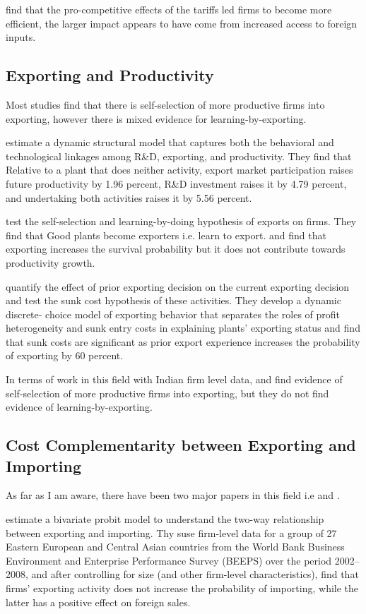 \documentclass[12pt]{article}
\begin{document}
\textcite{topalova2011trade} find that the pro-competitive
effects of the tariffs led firms to become more
efficient, the larger impact appears to have come from 
increased access to foreign inputs.
\subsection*{Exporting and Productivity}
Most studies find that there is self-selection of more productive
firms into exporting, however there is mixed evidence for
learning-by-exporting. 

\textcite{aw2011}  estimate a dynamic structural model that captures both the behavioral
and technological linkages among R\&D, exporting, and
productivity. They find that Relative to a
plant that does neither activity, export market participation raises future productivity
by 1.96 percent, R\&D investment raises it by 4.79 percent, and undertaking both
activities raises it by 5.56 percent. 

 \textcite{bernard1999exceptional} test the self-selection and
 learning-by-doing hypothesis of exports on firms. They find that Good
 plants become exporters i.e. learn to export. and find that exporting
 increases the survival probability but it does not contribute towards
 productivity growth.  

\textcite{roberts1997decision} quantify the effect of prior exporting
decision on the current exporting decision and test the sunk cost
hypothesis of these activities.  They  develop a dynamic discrete-
 choice model of exporting behavior that separates the roles of profit heterogeneity
 and sunk entry costs in explaining plants' exporting status and find
 that sunk costs are significant as prior export experience increases
 the probability of exporting by 60 percent.  


In terms of work in this field with Indian firm level  data,
\textcite{haidar2012trade} and \textcite{gupta2018exporting} find evidence of
self-selection of more productive firms into exporting, but they do
not find evidence of learning-by-exporting.  
\subsection*{Cost Complementarity between Exporting and Importing}
As far as I am aware, there have been two major papers in this field
i.e \textcite{aristei2013firms} and \textcite{kasahara2013productivity}. 

\textcite{aristei2013firms} estimate a bivariate probit model to
understand the two-way relationship between exporting and importing. 
Thy suse  firm-level data for a group of 27 Eastern European and 
Central Asian countries from the World Bank Business Environment 
and Enterprise Performance Survey (BEEPS) over the period 2002–2008, 
and after controlling for size (and other firm-level characteristics),
find that firms’ exporting activity does not increase the
probability of importing, while the latter has a positive effect
 on foreign sales. 
\end{document}
